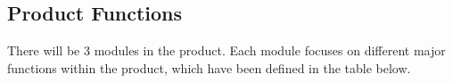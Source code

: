 \documentclass[]{article}
\begin{document}
\subsection{Product Functions}
\label{sub:product_functions}

There will be 3 modules in the product. Each module focuses on different major functions within the product, which have been defined in the table below.
\end{document}
